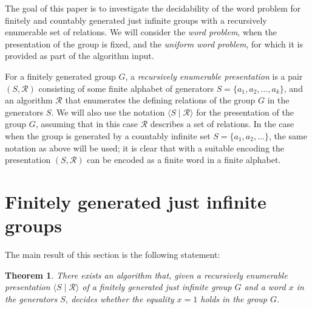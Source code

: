 \documentclass[12pt,a4paper]{amsart}
\newtheorem{theorem}{Theorem}
\begin{document}
\smallskip

The goal of this paper is to investigate the decidability of the word problem for finitely and countably generated just infinite groups with a recursively enumerable set of relations. We will consider the \emph{word problem}, when the presentation of the group is fixed, and the \emph{uniform word problem}, for which it is provided as part of the algorithm input.

\smallskip

For a finitely generated group $G$, a \emph{recursively enumerable presentation} is a pair $(S,\mathcal{R})$ consisting of some finite alphabet of generators $S=\{a_1,a_2,\ldots,a_k\}$, and an algorithm $\mathcal R$ that enumerates the defining relations of the group $G$ in the generators $S$. We will also use the notation $\langle S \mid \mathcal{R} \rangle$ for the presentation of the group $G$, assuming that in this case $\mathcal R$ describes a set of relations. In the case when the group is generated by a countably infinite set $S=\{a_1,a_2,\ldots\}$, the same notation as above will be used; it is clear that with a suitable encoding the presentation $(S,\mathcal{R})$ can be encoded as a finite word in a finite alphabet.

\section{Finitely generated just infinite groups}

The main result of this section is the following statement:

\begin{theorem}
\label{fg_theorem}
    There exists an algorithm that, given a recursively enumerable presentation $\langle S \mid \mathcal{R} \rangle$ of a finitely generated just infinite group $G$ and a word $x$ in the generators $S$, decides whether the equality $x=1$ holds in the group $G$.
\end{theorem}
\end{document}

